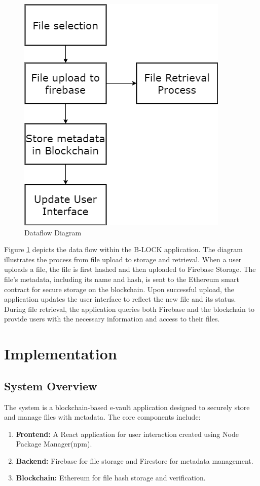 \documentclass[12pt,a4paper]{report}
\begin{document}
\begin{figure}[hbtp]
\centering
\includegraphics[scale=0.7]{./pic/dataflow.png}
\caption{Dataflow Diagram}
\label{fig:dataflow}
\end{figure}
Figure \ref{fig:dataflow} depicts the data flow within the B-LOCK application. The diagram illustrates the process from file upload to storage and retrieval. When a user uploads a file, the file is first hashed and then uploaded to Firebase Storage. The file's metadata, including its name and hash, is sent to the Ethereum smart contract for secure storage on the blockchain. Upon successful upload, the application updates the user interface to reflect the new file and its status. During file retrieval, the application queries both Firebase and the blockchain to provide users with the necessary information and access to their files.



\chapter{Implementation}
\section{System Overview}
\par
The system is a blockchain-based e-vault application designed to securely store and manage files with metadata. The core components include:
\begin{enumerate}
   \item \textbf{Frontend:} A React application\cite{reactdocs} for user interaction created using Node Package Manager(npm)\cite{npmdocs}.
   \item \textbf{Backend:} Firebase\cite{firebasedocs} for file storage and Firestore for metadata management.
   \item \textbf{Blockchain:} Ethereum\cite{ethereumdocs} for file hash storage and verification.
\end{enumerate}
\end{document}
